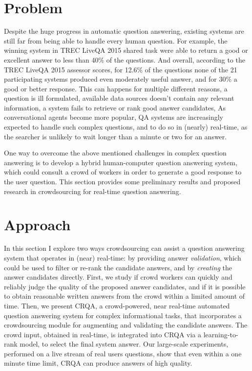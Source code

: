 %

\label{chapter:crowdsourcing}

\noindent

\section{Problem}
\label{section:crowdsourcing:problem}

Despite the huge progress in automatic question answering, existing systems are still far from being able to handle every human question.
For example, the winning system in TREC LiveQA 2015 shared task were able to return a good or excellent answer to less than 40\% of the questions.
And overall, according to the TREC LiveQA 2015 assessor scores, for 12.6\% of the questions none of the 21 participating systems produced even moderately useful answer, and for 30\% a good or better response.
This can happens for multiple different reasons, \eg a question is ill formulated, available data sources doesn't contain any relevant information, a system fails to retrieve or rank good answer candidates, \etc
As conversational agents become more popular, QA systems are increasingly expected to handle such complex questions, and to do so in (nearly) real-time, as the searcher is unlikely to wait longer than a minute or two for an answer.

One way to overcome the above mentioned challenges in complex question answering is to develop a hybrid human-computer question answering system, which could consult a crowd of workers in order to generate a good response to the user question.
This section provides some preliminary results and proposed research in crowdsourcing for real-time question answering.

\section{Approach}
\label{section:crowdsourcing:approach}

In this section I explore two ways crowdsourcing can assist a question answering system that operates in (near) real-time: by providing answer {\em validation}, which could be used to filter or re-rank the candidate answers, and by {\em creating} the answer candidates directly.
First, we study if crowd workers can quickly and reliably judge the quality of the proposed answer candidates, and if it is possible to obtain reasonable written answers from the crowd within a limited amount of time.
Then, we present CRQA, a crowd-powered, near real-time automated question answering system for complex informational tasks, that incorporates a crowdsourcing module for augmenting and validating the candidate answers.
The crowd input, obtained in real-time, is integrated into CRQA via a learning-to-rank model, to select the final system answer.
Our large-scale experiments, performed on a live stream of real users questions, show that even within a one minute time limit, CRQA can produce answers of high quality.

